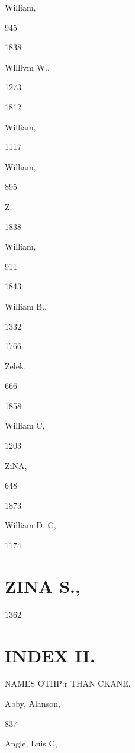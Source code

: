 {{{William, 


945 


1838 


Wllllvm W., 


1273 


1812 


William, 


1117 










William, 


895 




Z. 




1838 


William, 


911 








1843 


William B., 


1332 


1766 


Zelek, 


666 


1858 


William C, 


1203 




ZiNA, 


648 


1873 


William D. C, 


1174 




\chapter{ZINA S.,}

1362 



\chapter{INDEX II.}


NAMES OTIIP:r THAN CKANE. 



Abby, Alanson, 


837 


Angle, Luis C, 


}}}
